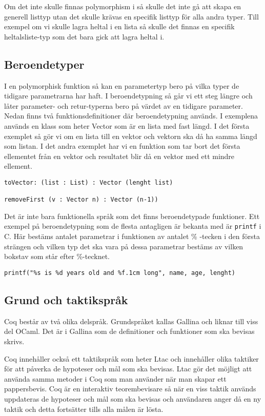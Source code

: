 Om det inte skulle finnas polymorphism i \coq så skulle det inte
gå att skapa en generell listtyp utan det skulle krävas en specifik
listtyp för alla andra typer. Till exempel om vi skulle lagra heltal
i en lista så skulle det finnas en specifik heltalsliste-typ som det bara
gick att lagra heltal i.

\subsection{Beroendetyper}
I en polymorphisk funktion så kan en parametertyp bero på vilka typer de
tidigare parametrarna har haft. I beroendetypning så går vi ett steg längre och
låter parameter- och retur-typerna bero på värdet av en tidigare parameter.
Nedan finns två funktionsdefinitioner där beroendetypning används.
I exemplena används en klass som heter Vector som är en lista med fast längd. I
det första exemplet så gör vi om en lista till en vektor och vektorn ska då ha
samma längd som listan. I det andra exemplet har vi en funktion som tar bort
det första ellementet från en vektor och resultatet blir då en vektor med ett
mindre ellement.
\begin{verbatim}
toVector: (list : List) : Vector (lenght list)

removeFirst (v : Vector n) : Vector (n-1))
\end{verbatim}
Det är inte bara funktionella språk som det finns beroendetypade funktioner.
Ett exempel på beroendetypning som de flesta antagligen är bekanta med är
\texttt{printf} i C. Här bestäms antalet parametrar i funktionen av antalet
\% -tecken i den första strängen och vilken typ det ska vara på dessa
parametrar bestäms av vilken bokstav som står efter \%-tecknet.
\begin{verbatim}
printf("%s is %d years old and %f.1cm long", name, age, lenght)
\end{verbatim}


\subsection{Grund och taktikspråk}
Coq består av två olika delspråk. Grundspråket kallas Gallina och liknar till
viss del OCaml. Det är i Gallina som de definitioner och funktioner som ska
bevisas skrivs.

Coq innehåller också ett taktikspråk som heter Ltac och innehåller olika
taktiker för att påverka de hypoteser och mål som ska bevisas. Ltac gör det
möjligt att använda samma metoder i Coq som man använder när man skapar ett
pappersbevis. Coq är en interaktiv teorembevisare så när en viss taktik används
uppdateras de hypoteser och mål som ska bevisas och användaren anger då en ny
taktik och detta fortsätter tills alla målen är lösta.
